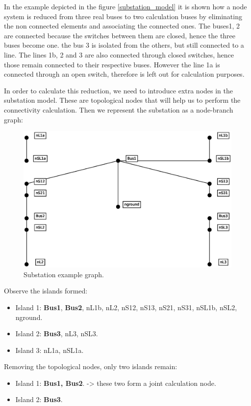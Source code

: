 \documentclass[nols,a4paper,twoside,notoc,fleqn]{tufte-book}
\begin{document}
In the example depicted in the figure \ref{substation_model} it is shown how a node system is reduced from three real buses to two calculation buses by eliminating the non connected elements and associating the connected ones. The buses1, 2 are connected because the switches between them are closed, hence the three buses become one. the bus 3 is isolated from the others, but still connected to a line. The lines 1b, 2 and 3 are also connected through closed switches, hence those remain connected to their respective buses. However the line 1a is connected through an open switch, therefore is left out for calculation purposes.

In order to calculate this reduction, we need to introduce extra nodes in the substation model. These are topological nodes that will help us to perform the connectivity calculation. Then we represent the substation as a node-branch graph:

\begin{center}
\begin{figure}
	\includegraphics[width=0.6\linewidth]{img/Substation_graph.eps}
	\caption{Substation example graph.}
	\label{substation_graph}
\end{figure}
\end{center}


Observe the islands formed:

\begin{itemize}
	\item Island 1: \textbf{Bus1}, \textbf{Bus2}, nL1b, nL2, nS12, nS13, nS21, nS31, nSL1b, nSL2, nground.
	\item Island 2: \textbf{Bus3}, nL3, nSL3.
	\item Island 3: nL1a, nSL1a.
\end{itemize}

Removing the topological nodes, only two islands remain:

\begin{itemize}
	\item Island 1: \textbf{Bus1, Bus2}.  -> these two form a joint calculation node.
	\item Island 2: \textbf{Bus3}.
\end{itemize}
\end{document}
